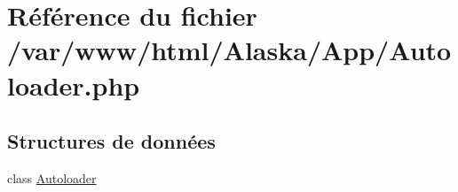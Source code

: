 \hypertarget{_autoloader_8php}{}\section{Référence du fichier /var/www/html/\+Alaska/\+App/\+Autoloader.php}
\label{_autoloader_8php}
\subsection*{Structures de données}
\begin{DoxyCompactItemize}
\item 
class \hyperlink{class_autoloader}{Autoloader}
\end{DoxyCompactItemize}
